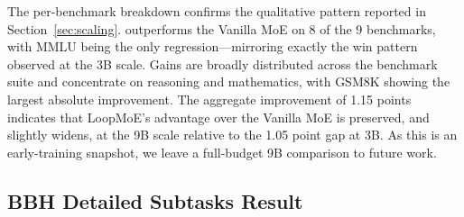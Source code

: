 The per-benchmark breakdown confirms the qualitative pattern reported in Section~\ref{sec:scaling}. \ourmodel outperforms the Vanilla MoE on 8 of the 9 benchmarks, with MMLU being the only regression—mirroring exactly the win pattern observed at the 3B scale. Gains are broadly distributed across the benchmark suite and concentrate on reasoning and mathematics, with GSM8K showing the largest absolute improvement. The aggregate improvement of 1.15 points indicates that LoopMoE's advantage over the Vanilla MoE is preserved, and slightly widens, at the 9B scale relative to the 1.05 point gap at 3B. As this is an early-training snapshot, we leave a full-budget 9B comparison to future work.

\subsection{BBH Detailed Subtasks Result}
\label{appendix:bbh}
